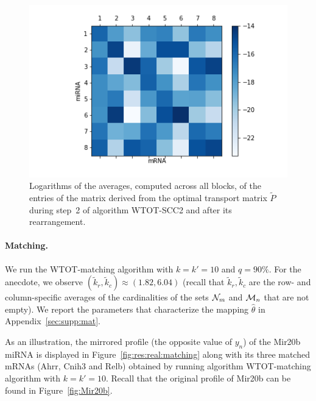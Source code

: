 \begin{figure}[ht]
  \centering \includegraphics[width=0.4\linewidth]{images/aver_cc.png}
  \caption{Logarithms  of the  averages, computed  across all  blocks, of  the
    entries  of  the   matrix  derived  from  the   optimal  transport  matrix
    $\tilde{P}$   during  step~2   of  algorithm   WTOT-SCC2  and   after  its
    rearrangement. }
    \label{fig:res:real:co-clusters}
\end{figure}


\paragraph{Matching.}

We run  the WTOT-matching  algorithm with  $k=k'=10$ and $q  = 90\%$.  For the
anecdote,  we observe  $(\tilde{k}_{r}, \tilde{k}_{c})  \approx (1.82,  6.04)$
(recall that  $\tilde{k}_{r},\tilde{k}_{c}$ are  the row-  and column-specific
averages of the cardinalities of the sets $\mathcal{N}_{m}$ and $\mathcal{M}_{n}$ that are
not  empty).   We   report  the  parameters  that   characterize  the  mapping
$\widehat{\theta}$ in Appendix~\ref{sec:supp:mat}.

As an illustration, the mirrored profile  (the opposite value of $y_n$) of the
Mir20b miRNA is displayed in Figure~\ref{fig:res:real:matching} along with its
three  matched mRNAs  (Ahrr, Cnih3  and  Relb) obtained  by running  algorithm
WTOT-matching algorithm with  $k=k'=10$.  Recall that the  original profile of
Mir20b can be found in Figure~\ref{fig:Mir20b}.

